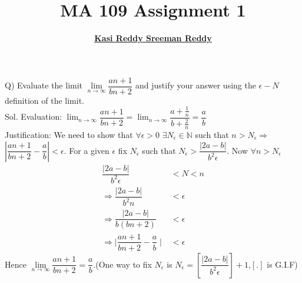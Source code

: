 \documentclass[11pt]{beamer}
\author[K. Sreeman Reddy]{\href{http://iamsreeman.github.io/}{\textbf{Kasi Reddy Sreeman Reddy}}\linebreak\text{2nd year physics student}\linebreak\text{\href{http://iamsreeman.github.io/MA109}{http://iamsreeman.github.io/MA109}}}
\title{MA 109 Assignment 1}
\date{}
\institute[]{IIT Bombay}
\begin{document}
\begin{frame}
\titlepage
\end{frame}
\fontsize{10}{12}\selectfont
\begin{frame}
Q) Evaluate the limit
$\underset{n \to \infty}{\lim}\dfrac{an+1}{bn+2}$
and justify your answer using the $\epsilon-N$ definition of the limit.\\
Sol. 
Evaluation: $\lim_{n \to \infty}\dfrac{an+1}{bn+2}=\lim_{n \to \infty}\dfrac{a+\frac{1}{n}}{b+\frac{2}{n}}=\dfrac{a}{b}$\\
Justification: We need to show that $\forall \epsilon>0$ $\exists N_{\epsilon}\in \mathbb{N}$ such that $n>N_{\epsilon}\Rightarrow$ $\left\lvert\dfrac{an+1}{bn+2}-\dfrac{a}{b}  \right\rvert<\epsilon$.
For a given $\epsilon$ fix $N_{\epsilon}$ such that $N_{\epsilon}>\dfrac{|2a-b|}{b^2\epsilon}$. Now $\forall n>N_{\epsilon}$
\begin{align*}
\dfrac{|2a-b|}{b^2\epsilon}&<N<n\\
\Rightarrow \dfrac{|2a-b|}{b^2n}&<\epsilon\\
\Rightarrow \dfrac{|2a-b|}{b(bn+2)}&<\epsilon\\
\Rightarrow \mid\dfrac{an+1}{bn+2}-\dfrac{a}{b} \mid&<\epsilon
\end{align*}
Hence $\underset{n \to \infty}{\lim}\dfrac{an+1}{bn+2}=\dfrac{a}{b}$.(One way to fix $N_{\epsilon}$ is $N_{\epsilon}=\left[\dfrac{|2a-b|}{b^2\epsilon}\right]+1$,$[.]$ is G.I.F)
\end{frame}
\end{document}
